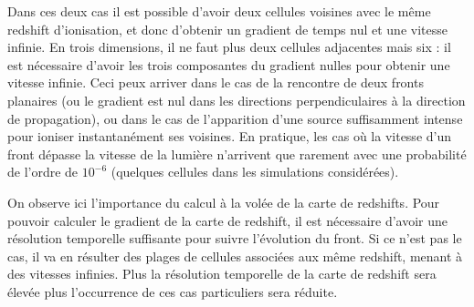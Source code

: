 Dans ces deux cas il est possible d'avoir deux cellules voisines avec le même redshift d'ionisation, et donc d'obtenir un gradient de temps nul et une vitesse infinie.
En trois dimensions, il ne faut plus deux cellules adjacentes mais six : il est nécessaire d'avoir les trois composantes du gradient nulles pour obtenir une vitesse infinie.
Ceci peux arriver dans le cas de la rencontre de deux fronts planaires (ou le gradient est nul dans les directions perpendiculaires à la direction de propagation), ou dans le cas de l'apparition d'une source suffisamment intense pour ioniser instantanément ses voisines.
En pratique, les cas où la vitesse d'un front dépasse la vitesse de la lumière n'arrivent que rarement avec une probabilité de l'ordre de $10^{-6}$ (quelques cellules dans les simulations considérées).

On observe ici l'importance du calcul à la volée de la carte de redshifts.
Pour pouvoir calculer le gradient de la carte de redshift, il est nécessaire d'avoir une résolution temporelle suffisante pour suivre l'évolution du front.
Si ce n'est pas le cas, il va en résulter des plages de cellules associées aux même redshift, menant à des vitesses infinies.
Plus la résolution temporelle de la carte de redshift sera élevée plus l’occurrence de ces cas particuliers sera réduite.






